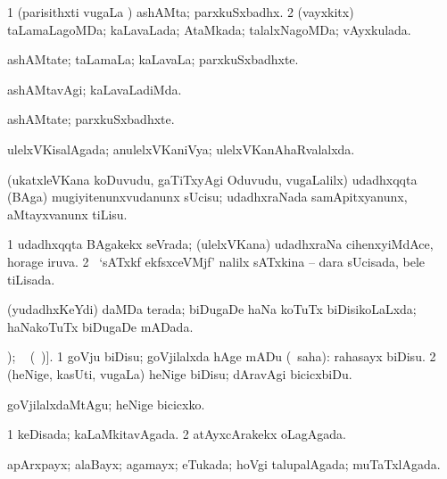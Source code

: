 \bentry
{} 
\gl{\gu}
\expl{}
\bmng
\bnum
\num{1} (parisithxti \mo vugaLa \vi) ashAMta; parxkuSxbadhx. 
\num{2} (vayxkitx) taLamaLagoMDa; kaLavaLada; AtaMkada; talalxNagoMDa; vAyxkulada. 
\enum
\emng
\eentry

\bentry
{} 
\gl{\nA}
\expl{}
\bmng
ashAMtate; taLamaLa; kaLavaLa; parxkuSxbadhxte. 
\emng
\eentry

\bentry
{} 
\gl{\kirxvi}
\expl{}
\bmng
ashAMtavAgi; kaLavaLadiMda. 
\emng
\eentry

\bentry
{} 
\gl{\nA}
\expl{}
\bmng
ashAMtate; parxkuSxbadhxte. 
\emng
\eentry

\bentry
{} 
\gl{\gu}
\expl{}
\bmng
ulelxVKisalAgada; anulelxVKaniVya; ulelxVKanAhaRvalalxda. 
\emng
\eentry

\bentry
{} 
\gl{\sakirx}
\expl{}
\bmng
(ukatxleVKana koDuvudu, gaTiTxyAgi Oduvudu, \mo vugaLalilx) udadhxqqta (BAga) mugiyitenunxvudanunx sUcisu; udadhxraNada samApitxyanunx, aMtayxvanunx tiLisu. 
\emng
\eentry

\bentry
{} 
\gl{\gu}
\expl{}
\bmng
\bnum
\num{1} udadhxqqta BAgakekx seVrada; (ulelxVKana) udadhxraNa cihenxyiMdAce, horage iruva. 
\num{2} \kanmu\ `sATxkf ekfsxceVMjf' nalilx sATxkina -- dara sUcisada, bele tiLisada. 
\enum
\emng
\eentry

\bentry
{} 
\gl{\gu}
\expl{}
\bmng
(yudadhxKeYdi) daMDa terada; biDugaDe haNa koTuTx biDisikoLaLxda; haNakoTuTx biDugaDe mADada. 
\emng
\eentry

\bentry
{} 
\gl{\sakirx}
\expl{[\BU\ matutx \BUkaq\ \eng{unravelled} (\ame\ }
); \vakaq\  (\ame\ )].\bmng
\bnum
\num{1} goVju biDisu; goVjilalxda hAge mADu (\rUpa\ saha):  rahasayx biDisu. 
\num{2} (heNige, kasUti, \mo vugaLa) heNige biDisu; dAravAgi bicicxbiDu. 
\enum
\emng

\noindent
\gl{\akirx}
\expl{}
\bmng
goVjilalxdaMtAgu; heNige bicicxko. 
\emng
\eentry

\bentry
{} 
\gl{\gu}
\expl{}
\bmng
\bnum
\num{1} keDisada; kaLaMkitavAgada. 
\num{2} atAyxcArakekx oLagAgada. 
\enum
\emng
\eentry

\bentry
{} 
\gl{\gu}
\expl{}
\bmng
apArxpayx; alaBayx; agamayx; eTukada; hoVgi talupalAgada; muTaTxlAgada. 
\emng
\eentry

